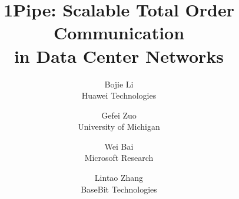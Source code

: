 \documentclass[sigconf,9pt]{acmart}
\numberwithin{equation}{section}
\begin{document}


\acmDOI{}

\acmISBN{}




\title{1Pipe: Scalable Total Order Communication \\in Data Center Networks}

\author{
{\rm Bojie Li}\\
Huawei Technologies
\and
{\rm Gefei Zuo}\\
University of Michigan
\and
{\rm Wei Bai}\\
Microsoft Research
\and
{\rm Lintao Zhang}\\
BaseBit Technologies
} %

\renewcommand{\shorttitle}{1Pipe: Scalable Total Order Communication in Data Center Networks}
\renewcommand{\shortauthors}{X.et al.}

\maketitle














{\footnotesize

}

\appendix

\end{document}
